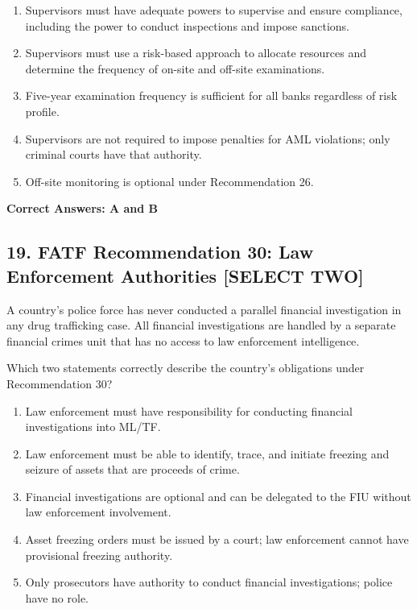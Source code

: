 \documentclass[11pt,a4paper]{article}
\begin{document}
	\begin{enumerate}[label=\Alph*.]
		\item Supervisors must have adequate powers to supervise and ensure compliance, including the power to conduct inspections and impose sanctions.
		\item Supervisors must use a risk-based approach to allocate resources and determine the frequency of on-site and off-site examinations.
		\item Five-year examination frequency is sufficient for all banks regardless of risk profile.
		\item Supervisors are not required to impose penalties for AML violations; only criminal courts have that authority.
		\item Off-site monitoring is optional under Recommendation 26.
	\end{enumerate}
	
	\textbf{Correct Answers: A and B}
	
	\subsection{19. FATF Recommendation 30: Law Enforcement Authorities \textnormal{[SELECT TWO]}}
	
	A country's police force has never conducted a parallel financial investigation in any drug trafficking case. All financial investigations are handled by a separate financial crimes unit that has no access to law enforcement intelligence.
	
	Which two statements correctly describe the country's obligations under Recommendation 30?
	
	\begin{enumerate}[label=\Alph*.]
		\item Law enforcement must have responsibility for conducting financial investigations into ML/TF.
		\item Law enforcement must be able to identify, trace, and initiate freezing and seizure of assets that are proceeds of crime.
		\item Financial investigations are optional and can be delegated to the FIU without law enforcement involvement.
		\item Asset freezing orders must be issued by a court; law enforcement cannot have provisional freezing authority.
		\item Only prosecutors have authority to conduct financial investigations; police have no role.
	\end{enumerate}
	
\end{document}
